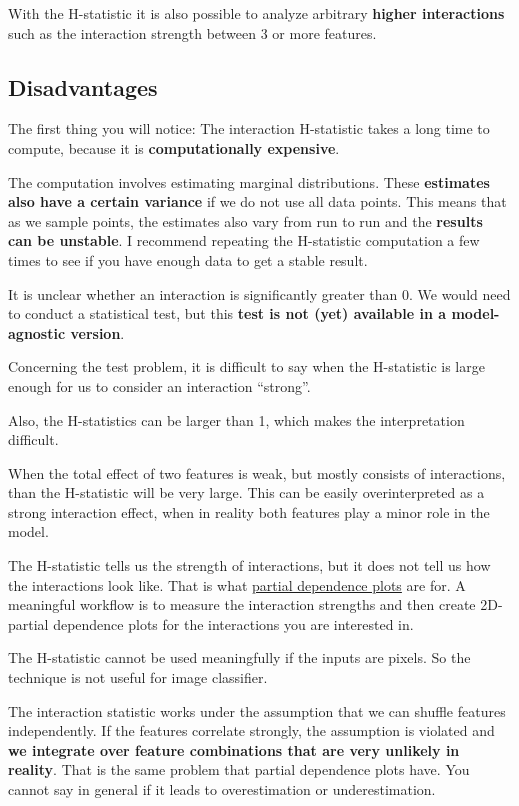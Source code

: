 \documentclass[
  12pt,
]{krantz}
\begin{document}
With the H-statistic it is also possible to analyze arbitrary \textbf{higher interactions} such as the interaction strength between 3 or more features.

\hypertarget{disadvantages-7}{%
\subsection{Disadvantages}\label{disadvantages-7}}

The first thing you will notice:
The interaction H-statistic takes a long time to compute, because it is \textbf{computationally expensive}.

The computation involves estimating marginal distributions.
These \textbf{estimates also have a certain variance} if we do not use all data points.
This means that as we sample points, the estimates also vary from run to run and the \textbf{results can be unstable}.
I recommend repeating the H-statistic computation a few times to see if you have enough data to get a stable result.

It is unclear whether an interaction is significantly greater than 0.
We would need to conduct a statistical test, but this \textbf{test is not (yet) available in a model-agnostic version}.

Concerning the test problem, it is difficult to say when the H-statistic is large enough for us to consider an interaction ``strong''.

Also, the H-statistics can be larger than 1, which makes the interpretation difficult.

When the total effect of two features is weak, but mostly consists of interactions, than the H-statistic will be very large.
This can be easily overinterpreted as a strong interaction effect, when in reality both features play a minor role in the model.

The H-statistic tells us the strength of interactions, but it does not tell us how the interactions look like.
That is what \protect\hyperlink{pdp}{partial dependence plots} are for.
A meaningful workflow is to measure the interaction strengths and then create 2D-partial dependence plots for the interactions you are interested in.

The H-statistic cannot be used meaningfully if the inputs are pixels.
So the technique is not useful for image classifier.

The interaction statistic works under the assumption that we can shuffle features independently.
If the features correlate strongly, the assumption is violated and \textbf{we integrate over feature combinations that are very unlikely in reality}.
That is the same problem that partial dependence plots have.
You cannot say in general if it leads to overestimation or underestimation.
\end{document}
